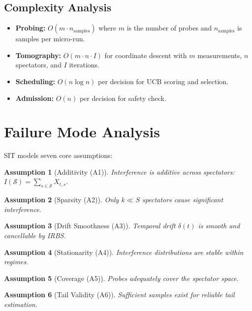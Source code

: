 \documentclass[11pt,twocolumn]{article}
\newtheorem{assumption}{Assumption}
\begin{document}
\subsection{Complexity Analysis}

\begin{itemize}
\item \textbf{Probing:} $O(m \cdot n_{\text{samples}})$ where $m$ is the number
of probes and $n_{\text{samples}}$ is samples per micro-run.
\item \textbf{Tomography:} $O(m \cdot n \cdot I)$ for coordinate descent with
$m$ measurements, $n$ spectators, and $I$ iterations.
\item \textbf{Scheduling:} $O(n \log n)$ per decision for UCB scoring and selection.
\item \textbf{Admission:} $O(n)$ per decision for safety check.
\end{itemize}

\section{Failure Mode Analysis}

SIT models seven core assumptions:

\begin{assumption}[Additivity (A1)]
Interference is additive across spectators:
$I(\mathcal{S}) = \sum_{s \in \mathcal{S}} X_{t,s}$.
\end{assumption}

\begin{assumption}[Sparsity (A2)]
Only $k \ll S$ spectators cause significant interference.
\end{assumption}

\begin{assumption}[Drift Smoothness (A3)]
Temporal drift $\delta(t)$ is smooth and cancellable by IRBS.
\end{assumption}

\begin{assumption}[Stationarity (A4)]
Interference distributions are stable within regimes.
\end{assumption}

\begin{assumption}[Coverage (A5)]
Probes adequately cover the spectator space.
\end{assumption}

\begin{assumption}[Tail Validity (A6)]
Sufficient samples exist for reliable tail estimation.
\end{assumption}
\end{document}
